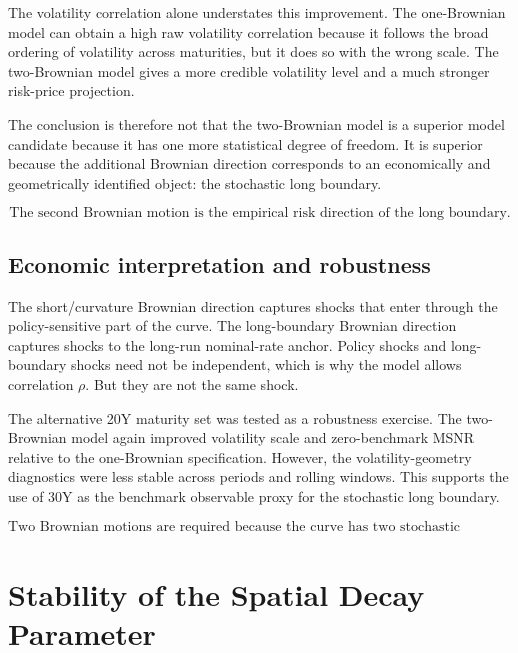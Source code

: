 \documentclass[11pt]{article}
\begin{document}
The volatility correlation alone understates this improvement. The one-Brownian model can obtain a high raw volatility correlation because it follows the broad ordering of volatility across maturities, but it does so with the wrong scale. The two-Brownian model gives a more credible volatility level and a much stronger risk-price projection.

The conclusion is therefore not that the two-Brownian model is a superior model candidate because it has one more statistical degree of freedom. It is superior because the additional Brownian direction corresponds to an economically and geometrically identified object: the stochastic long boundary.

\begin{equation}
  \boxed{\text{The second Brownian motion is the empirical risk direction of the long boundary.}}
\end{equation}

\subsection{Economic interpretation and robustness}

The short/curvature Brownian direction captures shocks that enter through the policy-sensitive part of the curve. The long-boundary Brownian direction captures shocks to the long-run nominal-rate anchor. Policy shocks and long-boundary shocks need not be independent, which is why the model allows correlation $\rho$. But they are not the same shock.

The alternative 20Y maturity set was tested as a robustness exercise. The two-Brownian model again improved volatility scale and zero-benchmark MSNR relative to the one-Brownian specification. However, the volatility-geometry diagnostics were less stable across periods and rolling windows. This supports the use of 30Y as the benchmark observable proxy for the stochastic long boundary.

\begin{equation}
  \boxed{\text{Two Brownian motions are required because the curve has two stochastic boundary sectors: short/curvature risk and long-boundary risk.}}
\end{equation}

\section{Stability of the Spatial Decay Parameter}
\end{document}
